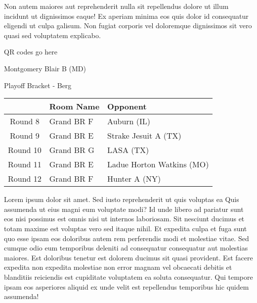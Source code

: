 \documentclass{article}%
\begin{document}
\newline%
Non autem maiores aut reprehenderit nulla sit repellendus dolore ut illum incidunt ut dignissimos eaque! Ex aperiam minima eos quis dolor id consequatur eligendi ut culpa galisum. Non fugiat corporis vel doloremque dignissimos sit vero quasi sed voluptatem explicabo.\newline%
\newline%
%
\vspace*{30pt}%
\begin{center}%
\begin{Huge}%
QR codes go here%
\end{Huge}%
\end{center}%
\newpage%
\begin{center}%
\begin{Huge}%
Montgomery Blair B (MD)%
\end{Huge}%
\vspace*{8pt}%
\linebreak%
\begin{Large}%
Playoff Bracket {-} Berg%
\end{Large}%
\end{center}%
\begin{tabularx}{\textwidth}{|c|Y|Y|}%
\hline%
&Room Name&Opponent\\%
\hline%
Round 8&Grand BR F&Auburn (IL)\\%
Round 9&Grand BR E&Strake Jesuit A (TX)\\%
Round 10&Grand BR G&LASA (TX)\\%
Round 11&Grand BR E&Ladue Horton Watkins (MO)\\%
Round 12&Grand BR F&Hunter A (NY)\\%
\hline%
\end{tabularx}%
\vspace*{8pt}%
\linebreak%
\newline%
\newline%
Lorem ipsum dolor sit amet. Sed iusto reprehenderit ut quis voluptas ea Quis assumenda ut eius magni eum voluptate modi? Id unde libero ad pariatur sunt eos nisi possimus est omnis nisi ut internos laboriosam. Sit nesciunt ducimus et totam maxime est voluptas vero sed itaque nihil. Et expedita culpa et fuga sunt quo esse ipsam eos doloribus autem rem perferendis modi et molestiae vitae.\newline%
\newline%
Sed cumque odio eum temporibus deleniti ad consequatur consequatur aut molestias maiores. Est doloribus tenetur est dolorem ducimus sit quasi provident. Est facere expedita non expedita molestiae non error magnam vel obcaecati debitis et blanditiis reiciendis est cupiditate voluptatem ea soluta consequatur. Qui tempore ipsam eos asperiores aliquid ex unde velit est repellendus temporibus hic quidem assumenda!\newline%
\end{document}
